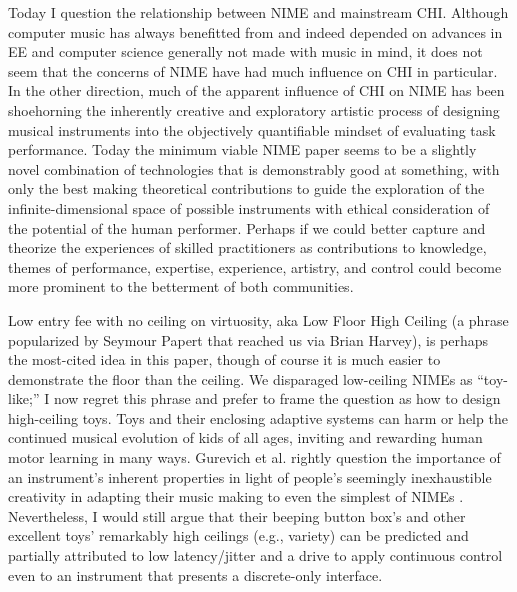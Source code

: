 Today I question the relationship between NIME and mainstream CHI.  Although computer music has always benefitted from and indeed depended on advances in EE and computer science generally not made with music in mind, it does not seem that the concerns of NIME have had much influence on CHI in particular. In the other direction, much of the apparent influence of CHI on NIME has been shoehorning the inherently creative and exploratory artistic process of designing musical instruments into the objectively quantifiable mindset of evaluating task performance. Today the minimum viable NIME paper seems to be a slightly novel combination of technologies that is demonstrably good at something, with only the best making theoretical contributions to guide the exploration of the infinite-dimensional space of possible instruments with ethical consideration of the potential of the human performer.   Perhaps if we could better capture and theorize the experiences of skilled practitioners as contributions to knowledge, themes of performance, expertise, experience, artistry, and control could become more prominent to the betterment of both communities.  

Low entry fee with no ceiling on virtuosity, aka Low Floor High Ceiling (a phrase popularized by Seymour Papert that reached us via Brian Harvey), is perhaps the most-cited idea in this paper, though of course it is much easier to demonstrate the floor than the ceiling.  We disparaged low-ceiling NIMEs as ``toy-like;'' I now regret this phrase and prefer to frame the question as how to design high-ceiling toys.  Toys and their enclosing adaptive systems can harm or help the continued musical evolution of kids of all ages, inviting and rewarding human motor learning in many ways.  Gurevich et al. rightly question the importance of an instrument's inherent properties in light of people's seemingly inexhaustible creativity in adapting their music making to even the simplest of NIMEs \cite{Gurevich:2010}.  Nevertheless, I would still argue that their beeping button box's and other excellent toys' remarkably high ceilings (e.g., variety) can be predicted and partially attributed to low latency/jitter and a drive to apply continuous control even to an instrument that presents a discrete-only interface.

